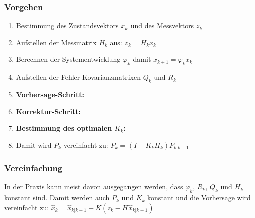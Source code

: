 	\subsubsection{Vorgehen}
	\begin{enumerate}
		\item Bestimmung des Zustandsvektors $x_k$ und des Messvektors $z_k$
		\item Aufstellen der Messmatrix $H_k$ aus: $z_k = H_k x_k$
		\item Berechnen der Systementwicklung $\varphi_k$ damit $x_{k+1}=\varphi_k x_k$
		\item Aufstellen der Fehler-Kovarianzmatrixen $Q_k$ und $R_k$
		\item \textbf{Vorhersage-Schritt:} \hspace{1cm}
		\item \textbf{Korrektur-Schritt:} \hspace{1cm}
		\item \textbf{Bestimmung des optimalen $K_k$:} \hspace{1cm}
		\item Damit wird $P_k$ vereinfacht zu: $P_k = (I-K_kH_k) P_{k|k-1}$
	\end{enumerate}
	
	\subsubsection{Vereinfachung}
		In der Praxis kann meist davon ausgegangen werden, dass $\varphi_k$, $R_k$,
		$Q_k$ und $H_k$ konstant sind. Damit werden auch $P_k$ und $K_k$ konstant und
		die Vorhersage wird vereinfacht zu: $\hat{x}_k = \hat{x}_{k|k-1} 
		+ K(z_k-H\hat{x}_{k|k-1})$ \\